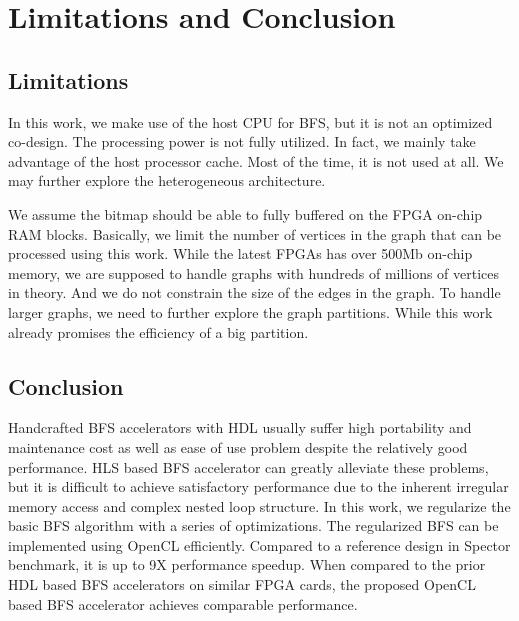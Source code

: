 \section{Limitations and Conclusion} \label{sec:conclusion}
\subsection{Limitations}
In this work, we make use of the host CPU for BFS, but it is not an optimized co-design. The processing power is not fully utilized.
In fact, we mainly take advantage of the host processor cache. Most of the time, it is not used at all. We may further 
explore the heterogeneous architecture.

We assume the bitmap should be able to fully buffered on the FPGA on-chip RAM blocks. Basically, we limit the number of vertices in the graph that 
can be processed using this work. While the latest FPGAs has over 500Mb on-chip memory, we are supposed to handle graphs with hundreds 
of millions of vertices in theory. And we do not constrain the size of the edges in the graph. To handle larger graphs, we need to further explore 
the graph partitions. While this work already promises the efficiency of a big partition.

\subsection{Conclusion}
Handcrafted BFS accelerators with HDL usually suffer high portability and maintenance cost 
as well as ease of use problem despite the relatively 
good performance. HLS based BFS accelerator can greatly alleviate these problems, but it is 
difficult to achieve satisfactory performance due to the inherent irregular memory access and 
complex nested loop structure. In this work, we regularize the basic BFS algorithm with  
a series of optimizations. The regularized BFS can be implemented using OpenCL efficiently.
Compared to a reference design in Spector benchmark, it is up to 9X performance speedup.
When compared to the prior HDL based BFS accelerators on similar FPGA cards, 
the proposed OpenCL based BFS accelerator achieves comparable performance.


